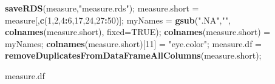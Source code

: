 \documentclass[]{article}
\newenvironment{Shaded}{\begin{snugshade}}{\end{snugshade}}
\newcommand{\DataTypeTok}[1]{\textcolor[rgb]{0.13,0.29,0.53}{#1}}
\newcommand{\DecValTok}[1]{\textcolor[rgb]{0.00,0.00,0.81}{#1}}
\newcommand{\KeywordTok}[1]{\textcolor[rgb]{0.13,0.29,0.53}{\textbf{#1}}}
\newcommand{\NormalTok}[1]{#1}
\newcommand{\OperatorTok}[1]{\textcolor[rgb]{0.81,0.36,0.00}{\textbf{#1}}}
\newcommand{\OtherTok}[1]{\textcolor[rgb]{0.56,0.35,0.01}{#1}}
\newcommand{\StringTok}[1]{\textcolor[rgb]{0.31,0.60,0.02}{#1}}
\begin{document}
\begin{Shaded}
\begin{Highlighting}[]
\KeywordTok{saveRDS}\NormalTok{(measure,}\StringTok{"measure.rds"}\NormalTok{);}
\NormalTok{measure.short =}\StringTok{ }\NormalTok{measure[,}\KeywordTok{c}\NormalTok{(}\DecValTok{1}\NormalTok{,}\DecValTok{2}\NormalTok{,}\DecValTok{4}\OperatorTok{:}\DecValTok{6}\NormalTok{,}\DecValTok{17}\NormalTok{,}\DecValTok{24}\NormalTok{,}\DecValTok{27}\OperatorTok{:}\DecValTok{50}\NormalTok{)];}
\NormalTok{myNames =}\StringTok{ }\KeywordTok{gsub}\NormalTok{(}\StringTok{".NA"}\NormalTok{,}\StringTok{""}\NormalTok{, }\KeywordTok{colnames}\NormalTok{(measure.short), }\DataTypeTok{fixed=}\OtherTok{TRUE}\NormalTok{);}
\KeywordTok{colnames}\NormalTok{(measure.short) =}\StringTok{ }\NormalTok{myNames;}
\KeywordTok{colnames}\NormalTok{(measure.short)[}\DecValTok{11}\NormalTok{] =}\StringTok{ "eye.color"}\NormalTok{;}
\NormalTok{measure.df =}\StringTok{ }\KeywordTok{removeDuplicatesFromDataFrameAllColumns}\NormalTok{(measure.short);}

\NormalTok{measure.df}
\end{Highlighting}
\end{Shaded}
\end{document}
